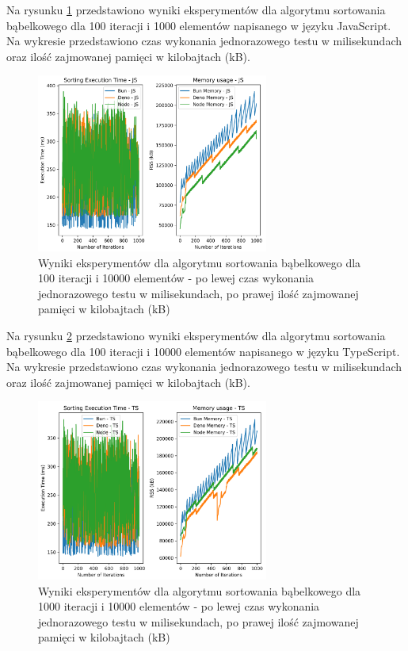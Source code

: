 Na rysunku \ref{fig:bubble_sorting_e4} przedstawiono wyniki eksperymentów dla algorytmu sortowania bąbelkowego dla 100 iteracji i 1000 elementów napisanego w języku JavaScript. Na wykresie przedstawiono czas wykonania jednorazowego testu w milisekundach oraz ilość zajmowanej pamięci w kilobajtach (kB).

\begin{figure}[H]
  \centering
  \includegraphics[width=0.68\textwidth]{Figures/sorting/sorting_bubble_1000_10000_js.png}
  \caption{Wyniki eksperymentów dla algorytmu sortowania bąbelkowego dla 100 iteracji i 10000 elementów - po lewej czas wykonania jednorazowego testu w milisekundach, po prawej ilość zajmowanej pamięci w kilobajtach (kB)}
  \label{fig:bubble_sorting_e4}
\end{figure}

Na rysunku \ref{fig:bubble_sorting_e4_ts} przedstawiono wyniki eksperymentów dla algorytmu sortowania bąbelkowego dla 100 iteracji i 10000 elementów napisanego w języku TypeScript. Na wykresie przedstawiono czas wykonania jednorazowego testu w milisekundach oraz ilość zajmowanej pamięci w kilobajtach (kB).

\begin{figure}[H]
  \centering
  \includegraphics[width=0.68\textwidth]{Figures/sorting/sorting_bubble_1000_10000_ts.png}
  \caption{Wyniki eksperymentów dla algorytmu sortowania bąbelkowego dla 1000 iteracji i 10000 elementów - po lewej czas wykonania jednorazowego testu w milisekundach, po prawej ilość zajmowanej pamięci w kilobajtach (kB)}
  \label{fig:bubble_sorting_e4_ts}
\end{figure}

